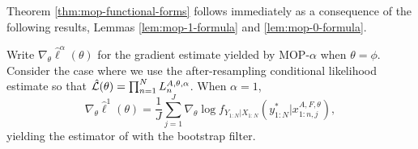 

Theorem \ref{thm:mop-functional-forms} follows immediately as a consequence of the following results, Lemmas \ref{lem:mop-1-formula} and \ref{lem:mop-0-formula}.

\begin{lem}
    \label{lem:mop-1-formula}
    Write $\nabla_\theta \hat\ell^\alpha(\theta)$ for the gradient estimate yielded by MOP-$\alpha$ when $\theta=\phi$. Consider the case where we use the after-resampling conditional likelihood estimate so that $\hat{\mathcal{L}}(\theta) = \prod_{n=1}^N L_n^{A, \theta, \alpha}$. When $\alpha=1$,
    \begin{equation}
        \nabla_\theta \hat{\ell}^1(\theta) 
        = \frac{1}{J}\sum_{j=1}^J \nabla_\theta \log f_{Y_{1:N}|X_{1:N}}\left(y_{1:N}^* | x_{1:n,j}^{A, F,\theta}\right),
    \end{equation}
    yielding the estimator of \cite{poyiadjis11, scibior21} with the bootstrap filter.
\end{lem}

